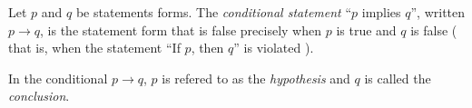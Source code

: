 \guard






\begin{defn}
\label{defn:conditionalStatement}
  Let $p$ and $q$ be statements forms.
  The \emph{conditional statement} ``$p$ implies $q$'', written $p \rightarrow q$, is the statement form that is false precisely when $p$ is true and $q$ is false ( that is, when the statement ``If $p$, then $q$'' is violated ).

  In the conditional $p\rightarrow q$, $p$ is refered to as the \emph{hypothesis} and $q$ is called the \emph{conclusion}.
\end{defn}
